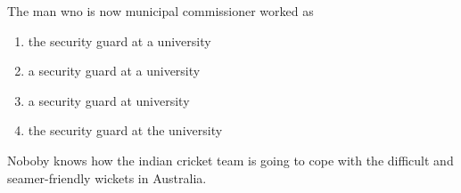                                            
\iffalse
    \title{Assignment}
    \author{EE24BTECH11028}
    \section{EE}
    \chapter{2016}
  \fi
    \item The man wno is now municipal commissioner worked as\\
    \begin{enumerate}
        \item the security guard at a university\\
        \item a security guard at a university\\
         \item a security guard at  university\\
          \item the security guard at the university   
    \end{enumerate}
    \item  Noboby knows how the indian cricket team is going to cope with the difficult and seamer-friendly wickets in Australia.\\
    
